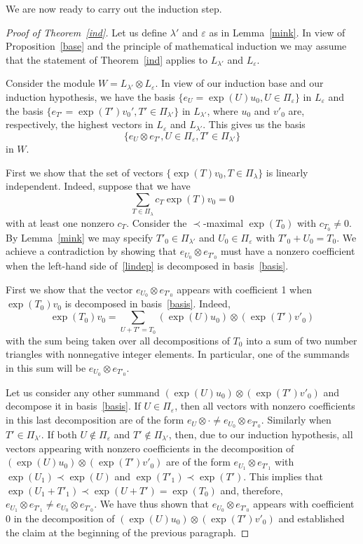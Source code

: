 \documentclass[10pt,a4paper]{article}
\theoremstyle{remark}\newtheorem{rema}[theo]{Remark}
\newcommand{\la}{\lambda}
\begin{document}
We are now ready to carry out the induction step.
\begin{proof}[Proof of Theorem~\ref{ind}]
Let us define $\la'$ and $\varepsilon$ as in Lemma~\ref{mink}. In view of Proposition~\ref{base} and the principle of mathematical induction we may assume that the statement of Theorem~\ref{ind} applies to $L_{\la'}$ and $L_\varepsilon$.

Consider the module $W=L_{\la'}\otimes L_\varepsilon$. In view of our induction base and our induction hypothesis, we have the basis $\{e_U=\exp(U)u_0,U\in\Pi_{\varepsilon}\}$ in $L_{\varepsilon}$ and the basis $\{e_{T'}=\exp(T')v_0',T'\in\Pi_{\la'}\}$ in $L_{\la'}$, where $u_0$ and $v'_0$ are, respectively, the highest vectors in $L_\varepsilon$ and $L_{\la'}$. This gives us the basis
\begin{equation}\label{basis}
\{e_U\otimes e_{T'},U\in\Pi_{\varepsilon},T'\in\Pi_{\la'}\}
\end{equation}
in $W$.

First we show that the set of vectors $\{\exp(T)v_0,T\in\Pi_\la\}$ is linearly independent. Indeed, suppose that we have
\begin{equation}\label{lindep}
\sum_{T\in\Pi_\la}c_T\exp(T)v_0=0
\end{equation}
with at least one nonzero $c_T$. Consider the $\prec$-maximal $\exp(T_0)$ with $c_{T_0}\neq 0$. By Lemma~\ref{mink} we may specify $T'_0\in\Pi_{\la'}$ and $U_0\in\Pi_\varepsilon$ with $T'_0+U_0=T_0$. We achieve a contradiction by showing that $e_{U_0}\otimes e_{T'_0}$ must have a nonzero coefficient when the left-hand side of~\eqref{lindep} is decomposed in basis~\eqref{basis}.

First we show that the vector $e_{U_0}\otimes e_{T'_0}$ appears with coefficient 1 when $\exp(T_0)v_0$ is decomposed in basis~\eqref{basis}. Indeed,
\[
\exp(T_0)v_0=\sum_{U+T'=T_0}(\exp(U)u_0)\otimes(\exp(T')v'_0)
\]
with the sum being taken over all decompositions of $T_0$ into a sum of two number triangles with nonnegative integer elements. In particular, one of the summands in this sum will be $e_{U_0}\otimes e_{T'_0}$.

Let us consider any other summand $(\exp(U)u_0)\otimes(\exp(T')v'_0)$ and decompose it in basis~\eqref{basis}. If $U\in\Pi_\varepsilon$, then all vectors with nonzero coefficients in this last decomposition are of the form $e_U\otimes\cdot\neq e_{U_0}\otimes e_{T'_0}$. Similarly when $T'\in\Pi_{\la'}$. If both $U\notin\Pi_\varepsilon$ and $T'\notin\Pi_{\la'}$, then, due to our induction hypothesis, all vectors appearing with nonzero coefficients in the decomposition of $(\exp(U)u_0)\otimes(\exp(T')v'_0)$ are of the form $e_{U_1}\otimes e_{T'_1}$ with $\exp(U_1)\prec\exp(U)$ and $\exp(T'_1)\prec\exp(T')$. This implies that $\exp(U_1+T'_1)\prec\exp(U+T')=\exp(T_0)$ and, therefore, $e_{U_1}\otimes e_{T'_1}\neq e_{U_0}\otimes e_{T'_0}$. We have thus shown that $e_{U_0}\otimes e_{T'_0}$ appears with coefficient 0 in the decomposition of $(\exp(U)u_0)\otimes(\exp(T')v'_0)$ and established the claim at the beginning of the previous paragraph.


\end{proof}
\end{document}
